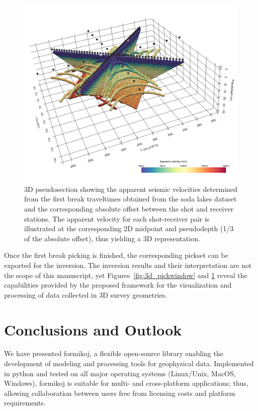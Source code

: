 \documentclass[a4paper,fleqn]{cas-sc}
\begin{document}
\begin{figure}
	\centering
	\includegraphics[width=.75\textwidth]{figures/3d_pseudosection.pdf}
	\caption{3D pseudosection showing the apparent seismic velocities determined from the first break traveltimes obtained from the soda lakes dataset and the corresponding absolute offset between the shot and receiver stations. The apparent velocity for each shot-receiver pair is illustrated at the corresponding 2D midpoint and pseudodepth (1/3 of the absolute offset), thus yielding a 3D representation.}
	\label{fig:3d_pseudosection}
\end{figure}

Once the first break picking is finished, the corresponding pickset can be exported for the inversion.
The inversion results and their interpretation are not the scope of this manuscript, yet Figures~\ref{fig:3d_pickwindow} and \ref{fig:3d_pseudosection} reveal the capabilities provided by the proposed framework for the visualization and processing of data collected in 3D survey geometries.

\section{Conclusions and Outlook}

We have presented formikoj, a flexible open-source library enabling the development of modeling and processing tools for geophysical data. Implemented in python and tested on all major operating systems (Linux/Unix, MacOS, Windows), formikoj is suitable for multi- and cross-platform applications; thus, allowing collaboration between users free from licensing costs and platform requirements.
\end{document}
